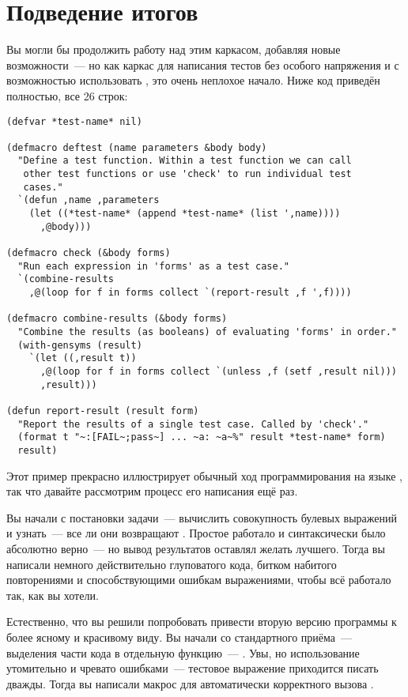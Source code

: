 \section{Подведение итогов}

Вы могли бы продолжить работу над этим каркасом, добавляя новые возможности~--- но как
каркас для написания тестов без особого напряжения и с возможностью использовать
, это очень неплохое начало. Ниже код приведён полностью, все 26 строк:

\begin{lstlisting}
(defvar *test-name* nil)

(defmacro deftest (name parameters &body body)
  "Define a test function. Within a test function we can call
   other test functions or use 'check' to run individual test
   cases."
  `(defun ,name ,parameters
    (let ((*test-name* (append *test-name* (list ',name))))
      ,@body)))

(defmacro check (&body forms)
  "Run each expression in 'forms' as a test case."
  `(combine-results
    ,@(loop for f in forms collect `(report-result ,f ',f))))

(defmacro combine-results (&body forms)
  "Combine the results (as booleans) of evaluating 'forms' in order."
  (with-gensyms (result)
    `(let ((,result t))
      ,@(loop for f in forms collect `(unless ,f (setf ,result nil)))
      ,result)))

(defun report-result (result form)
  "Report the results of a single test case. Called by 'check'."
  (format t "~:[FAIL~;pass~] ... ~a: ~a~%" result *test-name* form)
  result)
\end{lstlisting}

Этот пример прекрасно иллюстрирует обычный ход программирования на языке , так
что давайте рассмотрим процесс его написания ещё раз.

Вы начали с постановки задачи~--- вычислить совокупность булевых выражений и узнать~---
все ли они возвращают . Простое  работало и синтаксически было
абсолютно верно~--- но вывод результатов оставлял желать лучшего. Тогда вы написали
немного действительно глуповатого кода, битком набитого повторениями и способствующими
ошибкам выражениями, чтобы всё работало так, как вы хотели.

Естественно, что вы решили попробовать привести вторую версию программы к более ясному и
красивому виду. Вы начали со стандартного приёма~--- выделения части кода в отдельную
функцию~--- . Увы, но использование  утомительно и
чревато ошибками~--- тестовое выражение приходится писать дважды. Тогда вы написали макрос
 для автоматически корректного вызова .

